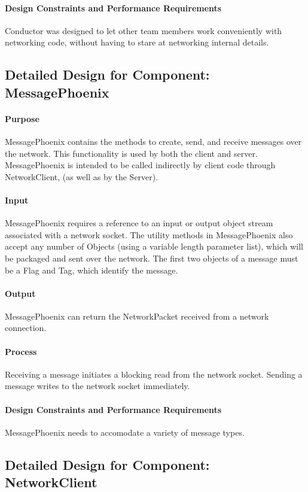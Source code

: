 \documentclass[12pt,a4paper,titlepage]{article}
\begin{document}
\paragraph{Design Constraints and Performance Requirements} Conductor was designed to let other team members work conveniently with networking code, without having to stare at networking internal details.


\subsection{Detailed Design for Component: MessagePhoenix}
\paragraph{Purpose} MessagePhoenix contains the methods to create, send, and receive messages over the network. This functionality is used by both the client and server. MessagePhoenix is intended to be called indirectly by client code through NetworkClient, (as well as by the Server).
\paragraph{Input} MessagePhoenix requires a reference to an input or output object stream associated with a network socket. The utility methods in MessagePhoenix also accept any number of Objects (using a variable length parameter list), which will be packaged and sent over the network. The first two objects of a message must be a Flag and Tag, which identify the message. 
\paragraph{Output} MessagePhoenix can return the NetworkPacket received from a network connection. 
\paragraph{Process} Receiving a message initiates a blocking read from the network socket. Sending a message writes to the network socket immediately. 
\paragraph{Design Constraints and Performance Requirements} MessagePhoenix needs to accomodate a variety of message types. 

\subsection{Detailed Design for Component: NetworkClient }
\end{document}
